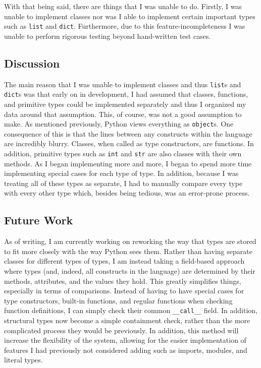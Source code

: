 \documentclass[10pt,twocolumn]{article}
\begin{document}
With that being said, there are things that I was unable to do. Firstly, I was unable to implement classes nor was I able to implement certain important types such as \verb|list| and \verb|dict|. Furthermore, due to this feature-incompleteness I was unable to perform rigorous testing beyond hand-written test cases.

\subsection{Discussion}

The main reason that I was unable to implement classes and thus \verb|list|s and \verb|dict|s was that early on in development, I had assumed that classes, functions, and primitive types could be implemented separately and thus I organized my data around that assumption. This, of course, was not a good assumption to make. As mentioned previously, Python views everything as \verb|object|s. One consequence of this is that the lines between any constructs within the language are incredibly blurry. Classes, when called as type constructors, are functions. In addition, primitive types such as \verb|int| and \verb|str| are also classes with their own methods. As I began implementing more and more, I began to spend more time implementing special cases for each type of type. In addition, because I was treating all of these types as separate, I had to manually compare every type with every other type which, besides being tedious, was an error-prone process. 

\subsection{Future Work}

As of writing, I am currently working on reworking the way that types are stored to fit more closely with the way Python sees them. Rather than having separate classes for different types of types, I am instead taking a field-based approach where types (and, indeed, all constructs in the language) are determined by their methods, attributes, and the values they hold. This greatly simplifies things, especially in terms of comparisons. Instead of having to have special cases for type constructors, built-in functions, and regular functions when checking function definitions, I can simply check their common \verb|__call__| field. In addition, structural types now become a simple containment check, rather than the more complicated process they would be previously. In addition, this method will increase the flexibility of the system, allowing for the easier implementation of features I had previously not considered adding such as imports, modules, and literal types.
\end{document}
